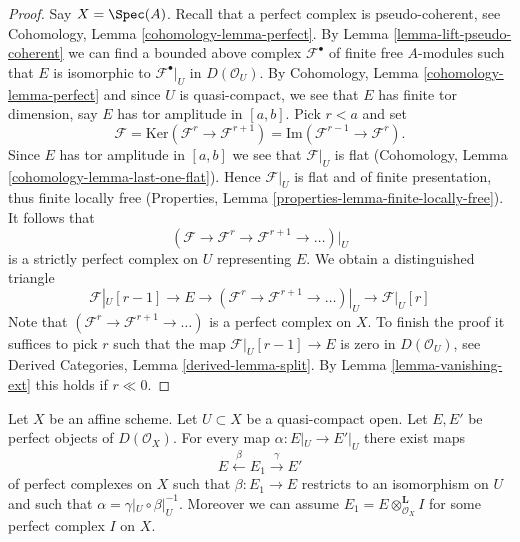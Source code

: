 \begin{proof}
Say $X = \Spec(A)$. Recall that a perfect complex is
pseudo-coherent, see
Cohomology, Lemma \ref{cohomology-lemma-perfect}.
By Lemma \ref{lemma-lift-pseudo-coherent} we can find a bounded above complex
$\mathcal{F}^\bullet$ of finite free $A$-modules such that $E$ is
isomorphic to $\mathcal{F}^\bullet|_U$ in $D(\mathcal{O}_U)$.
By Cohomology, Lemma \ref{cohomology-lemma-perfect} and since
$U$ is quasi-compact, we see that $E$ has finite tor dimension, say
$E$ has tor amplitude in $[a, b]$. Pick $r < a$ and set
$$
\mathcal{F} = \text{Ker}(\mathcal{F}^{r} \to \mathcal{F}^{r + 1})
= \text{Im}(\mathcal{F}^{r - 1} \to \mathcal{F}^r).
$$
Since $E$ has tor amplitude in $[a, b]$ we see that $\mathcal{F}|_U$ is
flat (Cohomology, Lemma \ref{cohomology-lemma-last-one-flat}).
Hence $\mathcal{F}|_U$ is flat and of finite presentation, thus finite
locally free (Properties, Lemma \ref{properties-lemma-finite-locally-free}).
It follows that
$$
(\mathcal{F} \to \mathcal{F}^r \to \mathcal{F}^{r + 1} \to \ldots )|_U
$$
is a strictly perfect complex on $U$ representing $E$.
We obtain a distinguished triangle
$$
\mathcal{F}|_U[r - 1] \to E \to
(\mathcal{F}^r \to \mathcal{F}^{r + 1} \to \ldots )|_U \to
\mathcal{F}|_U[r]
$$
Note that $(\mathcal{F}^r \to \mathcal{F}^{r + 1} \to \ldots )$ is
a perfect complex on $X$. To finish the proof it suffices to pick $r$
such that the map
$\mathcal{F}|_U[r - 1] \to E$ is zero in $D(\mathcal{O}_U)$, see
Derived Categories, Lemma \ref{derived-lemma-split}. By
Lemma \ref{lemma-vanishing-ext} this holds if $r \ll 0$.
\end{proof}

\begin{lemma}
\label{lemma-lift-map}
Let $X$ be an affine scheme. Let $U \subset X$ be a quasi-compact open.
Let $E, E'$ be perfect objects of $D(\mathcal{O}_X)$.
For every map $\alpha : E|_U \to E'|_U$ there exist maps
$$
E \xleftarrow{\beta} E_1 \xrightarrow{\gamma} E'
$$
of perfect complexes on $X$ such that $\beta : E_1 \to E$ restricts to an
isomorphism on $U$ and such that $\alpha = \gamma|_U \circ \beta|_U^{-1}$.
Moreover we can assume $E_1 = E \otimes_{\mathcal{O}_X}^\mathbf{L} I$
for some perfect complex $I$ on $X$.
\end{lemma}

